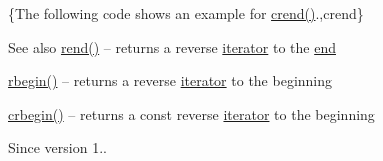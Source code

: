 \{The following code shows an example for {\ttfamily \hyperlink{classnlohmann_1_1basic__json_a223480466a0922267d680ec8f0722d58}{crend()}}.,crend\}

\begin{DoxySeeAlso}{See also}
\hyperlink{classnlohmann_1_1basic__json_a7a328b29b290cc300345376c54f618cb}{rend()} -- returns a reverse \hyperlink{classnlohmann_1_1basic__json_aa549b2b382916b3baafb526e5cb410bd}{iterator} to the \hyperlink{classnlohmann_1_1basic__json_a931267ec3f09eb67e4382f321b2c52bc}{end} 

\hyperlink{classnlohmann_1_1basic__json_aff8e38cd973bc94557fa8d36433c0e4c}{rbegin()} -- returns a reverse \hyperlink{classnlohmann_1_1basic__json_aa549b2b382916b3baafb526e5cb410bd}{iterator} to the beginning 

\hyperlink{classnlohmann_1_1basic__json_a044298d189bdf7e4b36492de9811ddd6}{crbegin()} -- returns a const reverse \hyperlink{classnlohmann_1_1basic__json_aa549b2b382916b3baafb526e5cb410bd}{iterator} to the beginning
\end{DoxySeeAlso}
\begin{DoxySince}{Since}
version 1.. 
\end{DoxySince}
